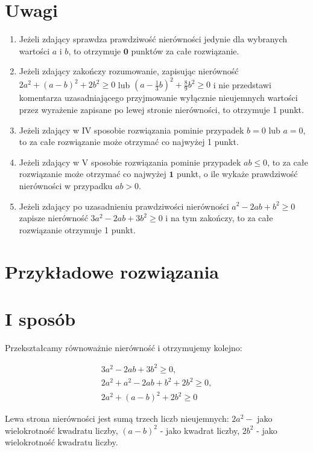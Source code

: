 \documentclass[10pt]{article}
\begin{document}
\section*{Uwagi}
\begin{enumerate}
  \item Jeżeli zdający sprawdza prawdziwość nierówności jedynie dla wybranych wartości $a$ i $b$, to otrzymuje $\mathbf{0}$ punktów za całe rozwiązanie.
  \item Jeżeli zdający zakończy rozumowanie, zapisując nierówność $2 a^{2}+(a-b)^{2}+2 b^{2} \geq 0$ lub $\left(a-\frac{1}{3} b\right)^{2}+\frac{8}{9} b^{2} \geq 0$ i nie przedstawi komentarza uzasadniającego przyjmowanie wyłącznie nieujemnych wartości przez wyrażenie zapisane po lewej stronie nierówności, to otrzymuje 1 punkt.
  \item Jeżeli zdający w IV sposobie rozwiązania pominie przypadek $b=0$ lub $a=0$, to za całe rozwiązanie może otrzymać co najwyżej 1 punkt.
  \item Jeżeli zdający w V sposobie rozwiązania pominie przypadek $a b \leq 0$, to za całe rozwiązanie może otrzymać co najwyżej $\mathbf{1}$ punkt, o ile wykaże prawdziwość nierówności w przypadku $a b>0$.
  \item Jeżeli zdający po uzasadnieniu prawdziwości nierówności $a^{2}-2 a b+b^{2} \geq 0$ zapisze nierówność $3 a^{2}-2 a b+3 b^{2} \geq 0$ i na tym zakończy, to za całe rozwiązanie otrzymuje 1 punkt.
\end{enumerate}

\section*{Przykładowe rozwiązania}
\section*{I sposób}
Przekształcamy równoważnie nierówność i otrzymujemy kolejno:

$$
\begin{gathered}
3 a^{2}-2 a b+3 b^{2} \geq 0, \\
2 a^{2}+a^{2}-2 a b+b^{2}+2 b^{2} \geq 0, \\
2 a^{2}+(a-b)^{2}+2 b^{2} \geq 0
\end{gathered}
$$

Lewa strona nierówności jest sumą trzech liczb nieujemnych: $2 a^{2}-$ jako wielokrotność kwadratu liczby, $(a-b)^{2}$ - jako kwadrat liczby, $2 b^{2}$ - jako wielokrotność kwadratu liczby.
\end{document}
